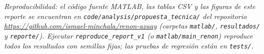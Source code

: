 \documentclass[11pt,a4paper]{article}
\begin{document}
\vspace{1em}
\noindent\small\textit{Reproducibilidad: el c\'odigo fuente MATLAB, las tablas CSV y las
figuras de este reporte se encuentran en \texttt{code/analysis/propuesta\_tecnica/} del
repositorio \url{https://github.com/ismael-minchala/renon-azuay} (carpetas \texttt{matlab/},
\texttt{resultados/} y \texttt{reporte/}). Ejecutar \texttt{reproduce\_report\_v1} (o
\texttt{matlab/main\_renon}) reproduce todos los resultados con semillas fijas; las pruebas
de regresi\'on est\'an en \texttt{tests/}.}
\end{document}

